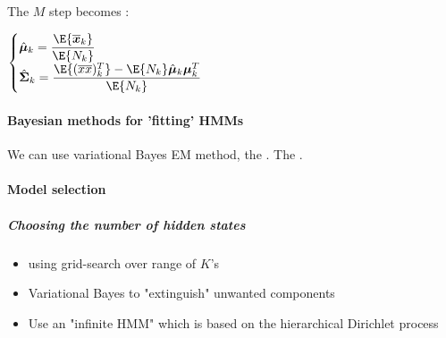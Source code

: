 The $M$ step becomes :

$\begin{cases}
    \hat{\bm{\mu}}_{k} = \dfrac{\E{\overline{\bm{x}}_{k}}}{\E{N_{k}}} \\
    \hat{\bm{\Sigma}}_{k} = \dfrac{\E{(\overline{x}\overline{x})^{T}_{k}} - \E{N_{k}}\hat{\bm{\mu}}_
    {k} \bm{{\mu}}^{T}_{k}}{\E{N_{k}}}
\end{cases}$

\paragraph{Bayesian methods for 'fitting' HMMs}
We can use variational Bayes EM method, the . The .

\paragraph{Model selection}
\subparagraph{Choosing the number of hidden states}
\begin{itemize}
    \item using grid-search over range of $K$'s 
    \item Variational Bayes to "extinguish" unwanted components
    \item Use an "infinite HMM" which is based on the hierarchical Dirichlet process
\end{itemize}

